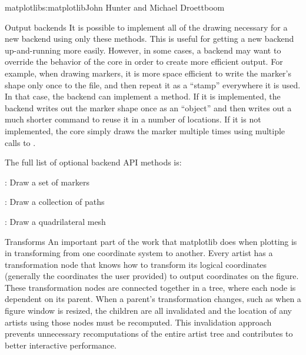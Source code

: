 \begin{aosachapter}{matplotlib}{s:matplotlib}{John Hunter and Michael Droettboom}
\begin{aosasect1}{Output backends}
It is possible to implement all of the drawing necessary for a new
backend using only these methods.  This is useful for getting a new
backend up-and-running more easily.  However, in some cases, a backend
may want to override the behavior of the core in order to create more
efficient output.  For example, when drawing markers, it is more space
efficient to write the marker's shape only once to the file, and then
repeat it as a ``stamp'' everywhere it is used.  In that case, the
backend can implement a  method.  If it is
implemented, the backend writes out the marker shape once as an
``object'' and then writes out a much shorter command to reuse it in
a number of locations.  If it is not implemented, the core simply
draws the marker multiple times using multiple calls to
.

The full list of optional backend API methods is:

\begin{aosaitemize}

  \item {}: Draw a set of markers

  \item {}: Draw a collection of paths

  \item {}: Draw a quadrilateral mesh

\end{aosaitemize}

\end{aosasect1}

\begin{aosasect1}{Transforms}
An important part of the work that matplotlib does when plotting is in
transforming from one coordinate system to another.  Every artist has
a transformation node that knows how to transform its logical
coordinates (generally the coordinates the user provided) to output
coordinates on the figure.  These transformation nodes are connected
together in a tree, where each node is dependent on its parent.  When
a parent's transformation changes, such as when a figure window is
resized, the children are all invalidated and the location of any
artists using those nodes must be recomputed.  This invalidation
approach prevents unnecessary recomputations of the entire artist tree
and contributes to better interactive performance.


\end{aosasect1}
\end{aosachapter}
